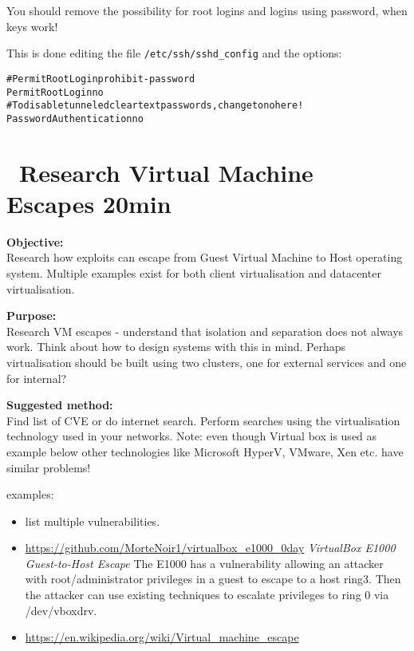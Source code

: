\documentclass[a4paper,11pt,notitlepage]{report}
\begin{document}
You should remove the possibility for root logins and logins using password, when keys work!

This is done editing the file \verb+/etc/ssh/sshd_config+ and the options:
\begin{alltt}\footnotesize
#PermitRootLogin prohibit-password
PermitRootLogin no
# To disable tunneled clear text passwords, change to no here!
PasswordAuthentication no
\end{alltt}



\chapter{\faExclamationTriangle\ Research Virtual Machine Escapes 20min}
\label{ex:vm-escape}


{\bf Objective:}\\
Research how exploits can escape from Guest Virtual Machine to Host operating system. Multiple examples exist for both client virtualisation and datacenter virtualisation.

{\bf Purpose:}\\
Research VM escapes - understand that isolation and separation does not always work. Think about how to design systems with this in mind. Perhaps virtualisation should be built using two clusters, one for external services and one for internal?

{\bf Suggested method:}\\
Find list of CVE or do internet search. Perform searches using the virtualisation technology used in your networks. Note: even though Virtual box is used as example below other technologies like Microsoft HyperV, VMware, Xen etc. have similar problems!


examples:

\begin{itemize}
\item {} list multiple vulnerabilities.
\item \url{https://github.com/MorteNoir1/virtualbox_e1000_0day} \emph{VirtualBox E1000 Guest-to-Host Escape} The E1000 has a vulnerability allowing an attacker with root/administrator privileges in a guest to escape to a host ring3. Then the attacker can use existing techniques to escalate privileges to ring 0 via /dev/vboxdrv.
\item \url{https://en.wikipedia.org/wiki/Virtual_machine_escape}
\end{itemize}
\end{document}
